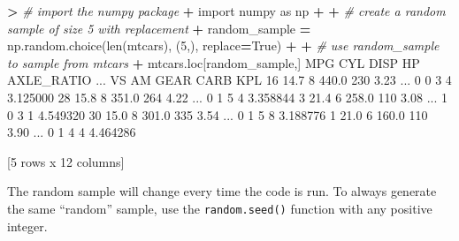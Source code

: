 \documentclass[
]{book}
\newenvironment{Shaded}{\begin{snugshade}}{\end{snugshade}}
\newcommand{\BuiltInTok}[1]{#1}
\newcommand{\CommentTok}[1]{\textcolor[rgb]{0.56,0.35,0.01}{\textit{#1}}}
\newcommand{\DecValTok}[1]{\textcolor[rgb]{0.00,0.00,0.81}{#1}}
\newcommand{\FloatTok}[1]{\textcolor[rgb]{0.00,0.00,0.81}{#1}}
\newcommand{\ImportTok}[1]{#1}
\newcommand{\NormalTok}[1]{#1}
\newcommand{\OperatorTok}[1]{\textcolor[rgb]{0.81,0.36,0.00}{\textbf{#1}}}
\newcommand{\VariableTok}[1]{\textcolor[rgb]{0.00,0.00,0.00}{#1}}
\begin{document}
\begin{Shaded}
\begin{Highlighting}[]
\OperatorTok{\textgreater{}} \CommentTok{\# import the numpy package}
\OperatorTok{+} \ImportTok{import}\NormalTok{ numpy }\ImportTok{as}\NormalTok{ np}
\OperatorTok{+} 
\OperatorTok{+} \CommentTok{\# create a random sample of size 5 with replacement}
\OperatorTok{+}\NormalTok{ random\_sample }\OperatorTok{=}\NormalTok{ np.random.choice(}\BuiltInTok{len}\NormalTok{(mtcars), (}\DecValTok{5}\NormalTok{,), replace}\OperatorTok{=}\VariableTok{True}\NormalTok{)}
\OperatorTok{+} 
\OperatorTok{+} \CommentTok{\# use random\_sample to sample from mtcars}
\OperatorTok{+}\NormalTok{ mtcars.loc[random\_sample,]}
\NormalTok{     MPG  CYL   DISP   HP  AXLE\_RATIO  ...  VS  AM  GEAR CARB       KPL}
\DecValTok{16}  \FloatTok{14.7}    \DecValTok{8}  \FloatTok{440.0}  \DecValTok{230}        \FloatTok{3.23}\NormalTok{  ...   }\DecValTok{0}   \DecValTok{0}     \DecValTok{3}    \DecValTok{4}  \FloatTok{3.125000}
\DecValTok{28}  \FloatTok{15.8}    \DecValTok{8}  \FloatTok{351.0}  \DecValTok{264}        \FloatTok{4.22}\NormalTok{  ...   }\DecValTok{0}   \DecValTok{1}     \DecValTok{5}    \DecValTok{4}  \FloatTok{3.358844}
\DecValTok{3}   \FloatTok{21.4}    \DecValTok{6}  \FloatTok{258.0}  \DecValTok{110}        \FloatTok{3.08}\NormalTok{  ...   }\DecValTok{1}   \DecValTok{0}     \DecValTok{3}    \DecValTok{1}  \FloatTok{4.549320}
\DecValTok{30}  \FloatTok{15.0}    \DecValTok{8}  \FloatTok{301.0}  \DecValTok{335}        \FloatTok{3.54}\NormalTok{  ...   }\DecValTok{0}   \DecValTok{1}     \DecValTok{5}    \DecValTok{8}  \FloatTok{3.188776}
\DecValTok{1}   \FloatTok{21.0}    \DecValTok{6}  \FloatTok{160.0}  \DecValTok{110}        \FloatTok{3.90}\NormalTok{  ...   }\DecValTok{0}   \DecValTok{1}     \DecValTok{4}    \DecValTok{4}  \FloatTok{4.464286}

\NormalTok{[}\DecValTok{5}\NormalTok{ rows x }\DecValTok{12}\NormalTok{ columns]}
\end{Highlighting}
\end{Shaded}

The random sample will change every time the code is run. To always generate the same ``random'' sample, use the \texttt{random.seed()} function with any positive integer.
\end{document}
